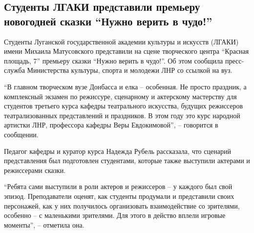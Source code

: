  
 
 
 
 
\subsection{Студенты ЛГАКИ представили премьеру новогодней сказки \enquote{Нужно верить в чудо!}}
\label{sec:24_12_2021.stz.news.lnr.lug_info.1.lgaki_skazka_verit_v_chudo}


Студенты Луганской государственной академии культуры и искусств (ЛГАКИ) имени
Михаила Матусовского представили на сцене творческого центра \enquote{Красная площадь,
7} премьеру сказки \enquote{Нужно верить в чудо!}. Об этом сообщила пресс-служба
Министерства культуры, спорта и молодежи ЛНР со ссылкой на вуз.


\enquote{В главном творческом вузе Донбасса и елка – особенная. Не просто праздник, а
комплексный экзамен по режиссуре, сценарному и актерскому мастерству для
студентов третьего курса кафедры театрального искусства, будущих режиссеров
театрализованных представлений и праздников. В этом году это курс народной
артистки ЛНР, профессора кафедры Веры Евдокимовой}, – говорится в сообщении.


Педагог кафедры и куратор курса Надежда Рубель рассказала, что сценарий
представления был подготовлен студентами, которые также выступили актерами и
режиссерами сказки.

\enquote{Ребята сами выступили в роли актеров и режиссеров – у каждого был свой эпизод.
Преподаватели оценят, как студенты продумали и представили своих персонажей,
как у них получилось организовать взаимодействие со зрителями, особенно – с
маленькими зрителями. Для этого в действо вплели игровые моменты}, – отметила
она.

